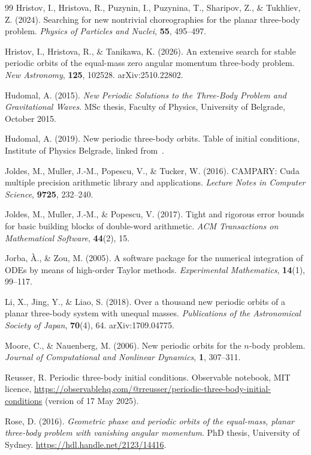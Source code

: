 \documentclass[11pt,a4paper]{article}
\begin{document}
\begin{thebibliography}{99}
Hristov, I., Hristova, R., Puzynin, I., Puzynina, T., Sharipov, Z., \& Tukhliev, Z. (2024).
Searching for new nontrivial choreographies for the planar three-body problem.
\textit{Physics of Particles and Nuclei}, \textbf{55}, 495--497.

Hristov, I., Hristova, R., \& Tanikawa, K. (2026).
An extensive search for stable periodic orbits of the equal-mass zero angular momentum three-body
problem.
\textit{New Astronomy}, \textbf{125}, 102528.
arXiv:2510.22802.

Hudomal, A. (2015).
\textit{New Periodic Solutions to the Three-Body Problem and Gravitational Waves}.
MSc thesis, Faculty of Physics, University of Belgrade, October 2015.

Hudomal, A. (2019).
New periodic three-body orbits.
Table of initial conditions, Institute of Physics Belgrade, linked from~\cite{threebodygallery}.

Joldes, M., Muller, J.-M., Popescu, V., \& Tucker, W. (2016).
CAMPARY: Cuda multiple precision arithmetic library and applications.
\textit{Lecture Notes in Computer Science}, \textbf{9725}, 232--240.

Joldes, M., Muller, J.-M., \& Popescu, V. (2017).
Tight and rigorous error bounds for basic building blocks of double-word arithmetic.
\textit{ACM Transactions on Mathematical Software}, \textbf{44}(2), 15.

Jorba, {\`A}., \& Zou, M. (2005).
A software package for the numerical integration of ODEs by means of high-order Taylor methods.
\textit{Experimental Mathematics}, \textbf{14}(1), 99--117.

Li, X., Jing, Y., \& Liao, S. (2018).
Over a thousand new periodic orbits of a planar three-body system with unequal masses.
\textit{Publications of the Astronomical Society of Japan}, \textbf{70}(4), 64.
arXiv:1709.04775.

Moore, C., \& Nauenberg, M. (2006).
New periodic orbits for the $n$-body problem.
\textit{Journal of Computational and Nonlinear Dynamics}, \textbf{1}, 307--311.

Reusser, R.
Periodic three-body initial conditions.
Observable notebook, MIT licence,
\url{https://observablehq.com/@rreusser/periodic-three-body-initial-conditions} (version of 17 May 2025).

Rose, D. (2016).
\textit{Geometric phase and periodic orbits of the equal-mass, planar three-body problem with
vanishing angular momentum}.
PhD thesis, University of Sydney.
\url{https://hdl.handle.net/2123/14416}.


\end{thebibliography}
\end{document}
